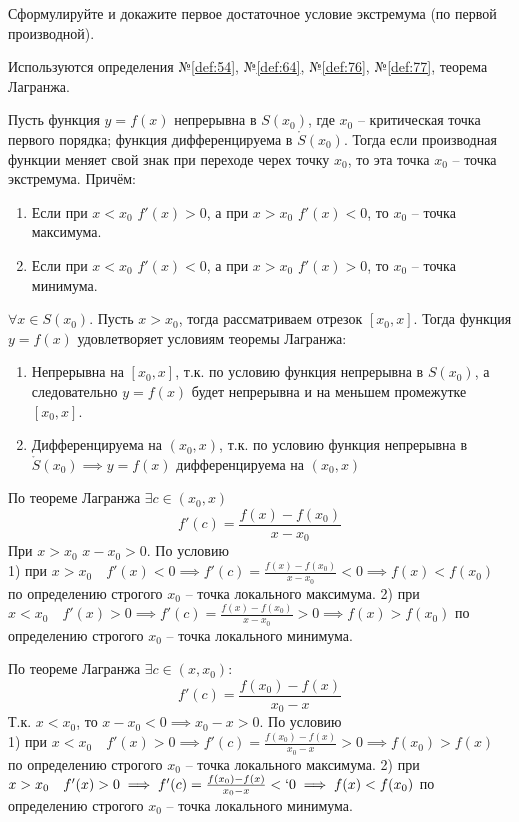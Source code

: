 \begin{question}
    Сформулируйте и докажите первое достаточное условие экстремума (по первой производной).
\end{question}
\begin{used}
    Используются определения №\ref{def:54}, №\ref{def:64}, №\ref{def:76}, №\ref{def:77}, теорема Лагранжа.
\end{used}
\begin{theorem}
    Пусть функция $y=f(x)$ непрерывна в $S(x_0)$, где $x_0$ -- критическая точка первого порядка; функция дифференцируема в $\mathring{S}(x_0)$. Тогда если производная функции меняет свой знак при переходе черех точку $x_0$, то эта точка $x_0$ -- точка экстремума. Причём:
    \begin{enumerate}
        \item Если при $x < x_0$ $f'(x) > 0$, а при  $x > x_0$ $f'(x) < 0$, то  $x_0$ -- точка максимума.
        \item Если при $x < x_0$ $f'(x) < 0$, а при  $x > x_0$ $f'(x) > 0$, то  $x_0$ -- точка минимума.
    \end{enumerate}
\end{theorem}
\begin{sufficiency}
    $\forall x \in S(x_0)$. Пусть $x > x_0$, тогда рассматриваем отрезок $[x_0, x]$. Тогда функция $y = f(x)$ удовлетворяет условиям теоремы Лагранжа:
    \begin{enumerate}
        \item Непрерывна на $[x_0, x]$, т.к. по условию функция непрерывна в $S(x_0)$, а следовательно $y=f(x)$ будет непрерывна и на меньшем промежутке $[x_0, x]$.
        \item Дифференцируема на $(x_0, x)$, т.к. по условию функция непрерывна в $\mathring{S}(x_0) \implies y = f(x)$ дифференцируема на $(x_0, x)$
    \end{enumerate}

    По теореме Лагранжа $\exists  c \in  (x_0, x)$ \[
        f'(c) = \frac{f(x) - f(x_0)}{x - x_0}
    \]
    При $x > x_0$ $x - x_0 > 0$. 
    По условию \\
    1) при $x > x_0 \quad f'(x) < 0 \implies f'(c) = \frac{f(x) - f(x_0)}{x - x_0} < 0 \implies f(x) < f(x_0)$ по определению строгого  $x_0$ -- точка локального максимума.
    2) при $x < x_0 \quad f'(x) > 0 \implies f'(c) = \frac{f(x) - f(x_0)}{x - x_0} > 0 \implies f(x) > f(x_0)$ по определению строгого  $x_0$ -- точка локального минимума.

    По теореме Лагранжа $\exists c \in (x, x_0)$: \[
        f'(c) = \frac{f(x_0) - f(x)}{x_0 - x}
    \] 
    Т.к. $x < x_0$, то $x - x_0 < 0 \implies x_0 - x > 0$.
    По условию \\
    1) при $x < x_0 \quad f'(x) > 0 \implies f'(c) = \frac{f(x_0) - f(x)}{x_0 - x} > 0 \implies f(x_0) > f(x)$ по определению строгого  $x_0$ -- точка локального максимума.
    2) при $x > x_0 \quad f'(x) > 0 \implies f'(c) = \frac{f(x_0) - f(x)}{x_0 - x} <` 0 \implies f(x) < f(x_0)$ по определению строгого  $x_0$ -- точка локального минимума.
\end{sufficiency}
\pagebreak



